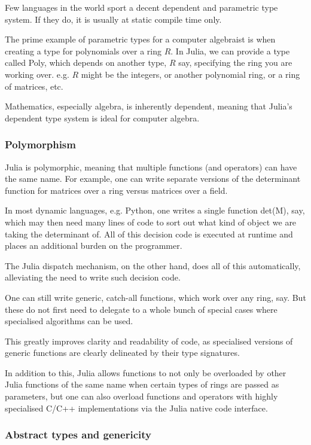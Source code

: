 \documentclass[a4paper,10pt]{article}
\begin{document}
Few languages in the world sport a decent dependent and parametric type system. If they
do, it is usually at static compile time only.

The prime example of parametric types for a computer algebraist is when creating a type for
polynomials over a ring $R$. In Julia, we can provide a type called Poly, which depends on
another type, $R$ say, specifying the ring you are working over. e.g. $R$ might be the
integers, or another polynomial ring, or a ring of matrices, etc.

Mathematics, especially algebra, is inherently dependent, meaning that Julia's dependent type system
is ideal for computer algebra.

\subsubsection{Polymorphism}
 
Julia is polymorphic, meaning that multiple functions (and operators) can have the same name. For
example, one can write separate versions of the determinant function for matrices over a ring versus
matrices over a field.

In most dynamic languages, e.g. Python, one writes a single function det(M), say, which
may then need many lines of code to sort out what kind of object we are taking the determinant of. All
of this decision code is executed at runtime and places an additional burden on the programmer. 

The Julia dispatch mechanism, on the other hand, does all of this automatically, alleviating the need
to write such decision code.

One can still write generic, catch-all functions, which work over any ring, say. But
these do not first need to delegate to a whole bunch of special cases where specialised
algorithms can be used. 

This greatly improves clarity and readability of code, as specialised versions of generic functions are
clearly delineated by their type signatures.

In addition to this, Julia allows functions to not only be overloaded by other Julia functions of the
same name when certain types of rings are passed as parameters, but one can also overload functions
and operators with highly specialised C/C++ implementations via the Julia native code interface.

\subsubsection{Abstract types and genericity}
\end{document}
